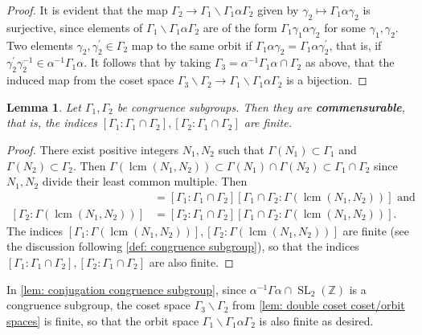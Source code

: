 \documentclass[10pt,leqno,twoside,b5paper]{article}
\theoremstyle{plain}
\newtheorem{lemma}[lem]{Lemma}
\theoremstyle{definition}
\numberwithin{equation}{section}
\numberwithin{lem}{section}
\newcommand{\textib}[1]{\textbf{\textit{#1\index{#1}}}} %
\DeclareMathOperator{\SL}{SL}
\newcommand{\slz}{\SL_2(\mathbb{Z})}
\DeclareMathOperator{\lcm}{lcm}
\begin{document}
\begin{proof}
    It is evident that the map $\varGamma_2\to \varGamma_1\backslash\varGamma_1\alpha\varGamma_2$ given by $\gamma_2\mapsto \varGamma_1\alpha\gamma_2$ is surjective, since elements of $\varGamma_1\backslash\varGamma_1\alpha\varGamma_2$ are of the form $\varGamma_1\gamma_1\alpha\gamma_2$ for some $\gamma_1,\gamma_2$. Two elements $\gamma_2,\gamma_2^\prime\in\varGamma_2$ map to the same orbit if $\varGamma_1\alpha\gamma_2 = \varGamma_1\alpha\gamma_2^\prime$, that is, if $\gamma_2^\prime\gamma_2^{-1}\in \alpha^{-1}\varGamma_1\alpha$. It follows that by taking $\varGamma_3 = \alpha^{-1}\varGamma_1\alpha\cap \varGamma_2$ as above, that the induced map from the coset space $\varGamma_3\backslash\varGamma_2\to \varGamma_1\backslash \varGamma_1\alpha\varGamma_2$ is a bijection.
\end{proof}
\begin{lemma}\label{lem: congruence subgroups commensurable}
    Let $\varGamma_1,\varGamma_2$ be congruence subgroups. Then they are \textib{commensurable}, that is, the indices $[\varGamma_1 : \varGamma_1\cap \varGamma_2], [\varGamma_2 : \varGamma_1\cap \varGamma_2]$ are finite.
\end{lemma}
\begin{proof}
    There exist positive integers $N_1,N_2$ such that $\varGamma(N_1)\subset \varGamma_1$ and $\varGamma(N_2)\subset \varGamma_2$. Then $\varGamma(\lcm(N_1,N_2))\subset \varGamma(N_1)\cap \varGamma(N_2)\subset \varGamma_1\cap \varGamma_2$ since $N_1,N_2$ divide their least common multiple. Then \begin{align*}
        [\varGamma_1 : \varGamma(\lcm(N_1,N_2))] &= [\varGamma_1 : \varGamma_1\cap \varGamma_2][\varGamma_1\cap \varGamma_2 : \varGamma(\lcm(N_1,N_2))] \text{ and}\\
        [\varGamma_2 : \varGamma(\lcm(N_1,N_2))] &= [\varGamma_2 : \varGamma_1\cap \varGamma_2][\varGamma_1\cap \varGamma_2 : \varGamma(\lcm(N_1,N_2))].
    \end{align*} The indices $[\varGamma_1 : \varGamma(\lcm(N_1,N_2))],[\varGamma_2 : \varGamma(\lcm(N_1,N_2))]$ are finite (see the discussion following \cref{def: congruence subgroup}), so that the indices $[\varGamma_1 : \varGamma_1\cap \varGamma_2], [\varGamma_2 : \varGamma_1\cap \varGamma_2]$ are also finite.
\end{proof}
In \cref{lem: conjugation congruence subgroup}, since $\alpha^{-1}\varGamma\alpha\cap\slz$ is a congruence subgroup, the coset space $\varGamma_3\backslash \varGamma_2$ from \cref{lem: double coset coset/orbit spaces} is finite, so that the orbit space $\varGamma_1\backslash \varGamma_1\alpha\varGamma_2$ is also finite as desired.
\end{document}
